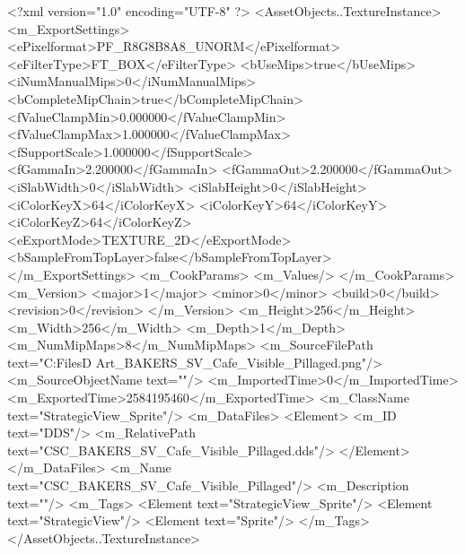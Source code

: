 <?xml version="1.0" encoding="UTF-8" ?>
<AssetObjects..TextureInstance>
	<m_ExportSettings>
		<ePixelformat>PF_R8G8B8A8_UNORM</ePixelformat>
		<eFilterType>FT_BOX</eFilterType>
		<bUseMips>true</bUseMips>
		<iNumManualMips>0</iNumManualMips>
		<bCompleteMipChain>true</bCompleteMipChain>
		<fValueClampMin>0.000000</fValueClampMin>
		<fValueClampMax>1.000000</fValueClampMax>
		<fSupportScale>1.000000</fSupportScale>
		<fGammaIn>2.200000</fGammaIn>
		<fGammaOut>2.200000</fGammaOut>
		<iSlabWidth>0</iSlabWidth>
		<iSlabHeight>0</iSlabHeight>
		<iColorKeyX>64</iColorKeyX>
		<iColorKeyY>64</iColorKeyY>
		<iColorKeyZ>64</iColorKeyZ>
		<eExportMode>TEXTURE_2D</eExportMode>
		<bSampleFromTopLayer>false</bSampleFromTopLayer>
	</m_ExportSettings>
	<m_CookParams>
		<m_Values/>
	</m_CookParams>
	<m_Version>
		<major>1</major>
		<minor>0</minor>
		<build>0</build>
		<revision>0</revision>
	</m_Version>
	<m_Height>256</m_Height>
	<m_Width>256</m_Width>
	<m_Depth>1</m_Depth>
	<m_NumMipMaps>8</m_NumMipMaps>
	<m_SourceFilePath text="C:\Users\Shadow\Desktop\Working Files\2D Art\Quarters\Bakers\StrategicView\CSC_BAKERS_SV_Cafe_Visible_Pillaged.png"/>
	<m_SourceObjectName text=""/>
	<m_ImportedTime>0</m_ImportedTime>
	<m_ExportedTime>2584195460</m_ExportedTime>
	<m_ClassName text="StrategicView_Sprite"/>
	<m_DataFiles>
		<Element>
			<m_ID text="DDS"/>
			<m_RelativePath text="CSC_BAKERS_SV_Cafe_Visible_Pillaged.dds"/>
		</Element>
	</m_DataFiles>
	<m_Name text="CSC_BAKERS_SV_Cafe_Visible_Pillaged"/>
	<m_Description text=""/>
	<m_Tags>
		<Element text="StrategicView_Sprite"/>
		<Element text="StrategicView"/>
		<Element text="Sprite"/>
	</m_Tags>
</AssetObjects..TextureInstance>

